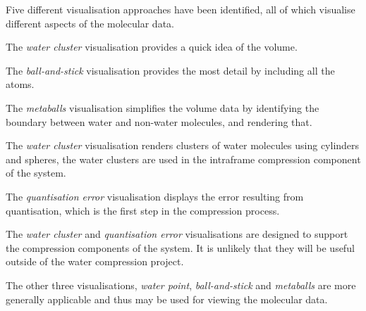 Five different visualisation approaches have been identified, all of which
visualise different aspects of the molecular data.

The \emph{water cluster} visualisation provides a quick idea of the volume.

The \emph{ball-and-stick} visualisation provides the most detail by including
all the atoms.

The \emph{metaballs} visualisation simplifies the volume data by identifying
the boundary between water and non-water molecules, and rendering that.

The \emph{water cluster} visualisation renders clusters of water molecules
using cylinders and spheres, the water clusters are used in the intraframe
compression component of the system.

The \emph{quantisation error} visualisation displays the error resulting from
quantisation, which is the first step in the compression process.

The \emph{water cluster} and \emph{quantisation error} visualisations are
designed to support the compression components of the system. It is unlikely
that they will be useful outside of the water compression project.

The other three visualisations, \emph{water point}, \emph{ball-and-stick} and
\emph{metaballs} are more generally applicable and thus may be used for viewing
the molecular data.



